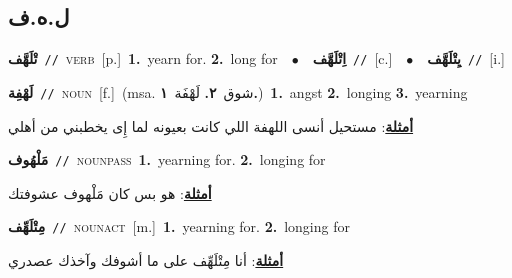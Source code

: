 \documentclass[10pt,a4paper,twoside]{article} %
\begin{document}
\begin{multicols}{2}
\vspace{-3mm}
\subsection*{\color{blue}\foreignlanguage{arabic}{ل.ه.ف}\color{blue}{}} 

{\setlength\topsep{0pt}\textbf{\foreignlanguage{arabic}{تْلَهَّف}}\ {\color{gray}\texttt{//}\color{black}}\ \textsc{verb}\ [p.]\ \textbf{1.}~yearn for.  \textbf{2.}~long for\ \ $\bullet$\ \ \setlength\topsep{0pt}\textbf{\foreignlanguage{arabic}{اِتْلَهَّف}}\ {\color{gray}\texttt{//}\color{black}}\ [c.]\ \ $\bullet$\ \ \setlength\topsep{0pt}\textbf{\foreignlanguage{arabic}{يِتْلَهَّف}}\ {\color{gray}\texttt{//}\color{black}}\ [i.]\ } \vspace{2mm}

{\setlength\topsep{0pt}\textbf{\foreignlanguage{arabic}{لَهْفِة}}\ {\color{gray}\texttt{//}\color{black}}\ \textsc{noun}\ [f.]\ \color{gray}(msa. \foreignlanguage{arabic}{شوق}~\foreignlanguage{arabic}{\textbf{٢.}}  \foreignlanguage{arabic}{لَهْفَة}~\foreignlanguage{arabic}{\textbf{١.}})\color{black}\ \textbf{1.}~angst  \textbf{2.}~longing  \textbf{3.}~yearning\  \begin{flushright}\color{gray}\foreignlanguage{arabic}{\textbf{\underline{\foreignlanguage{arabic}{أمثلة}}}: مستحيل أنسى اللهفة اللي كانت بعيونه لما إِى يخطبني من أهلي}\end{flushright}\color{black}} \vspace{2mm}

{\setlength\topsep{0pt}\textbf{\foreignlanguage{arabic}{مَلْهُوف}}\ {\color{gray}\texttt{//}\color{black}}\ \textsc{noun\textunderscore pass}\ \textbf{1.}~yearning for.  \textbf{2.}~longing for\  \begin{flushright}\color{gray}\foreignlanguage{arabic}{\textbf{\underline{\foreignlanguage{arabic}{أمثلة}}}: هو بس كان مَلْهوف عشوفتك}\end{flushright}\color{black}} \vspace{2mm}

{\setlength\topsep{0pt}\textbf{\foreignlanguage{arabic}{مِتْلَهِّف}}\ {\color{gray}\texttt{//}\color{black}}\ \textsc{noun\textunderscore act}\ [m.]\ \textbf{1.}~yearning for.  \textbf{2.}~longing for\  \begin{flushright}\color{gray}\foreignlanguage{arabic}{\textbf{\underline{\foreignlanguage{arabic}{أمثلة}}}: أنا مِتْلَهِّف على ما أشوفك وآخذك عصدري}\end{flushright}\color{black}} \vspace{2mm}


\end{multicols}
\end{document}
